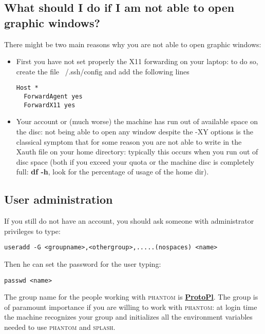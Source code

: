\documentclass[10pt,a4paper,twoside]{article} %
\begin{document}
\subsection{What should I do if I am not able to open graphic windows?}

There might be two main reasons why you are not able to open graphic windows: 
\begin{itemize}
\item First you have not set properly the X11 forwarding on your laptop: to do so, create the file ~/.ssh/config and add the following lines
\begin{verbatim}
Host *
  ForwardAgent yes
  ForwardX11 yes
\end{verbatim}

\item Your account or (much worse) the machine has run out of available space on the disc: not being able to open any window despite the -XY options is the classical symptom that for some reason you are not able to write in the Xauth file on your home directory: typically this occurs when you run out of disc space (both if you exceed your quota or the machine disc is completely full: \textbf{df -h}, look for the percentage of usage of the home dir).
\end{itemize}

\subsection{User administration}
If you still do not have an account, you should ask someone with administrator privileges to type:
\begin{verbatim}
useradd -G <groupname>,<othergroup>,.....(nospaces) <name>
\end{verbatim}
Then he can set the password for the user typing:
\begin{verbatim}
passwd <name>
\end{verbatim}
The group name for the people working with \textsc{phantom} is \underline{\textbf{ProtoPl}}. The group is of paramount importance if you are willing to work with \textsc{phantom}: at login time the machine recognizes your group and initializes all the environment variables needed to use \textsc{phantom} and \textsc{splash}.
\end{document}
